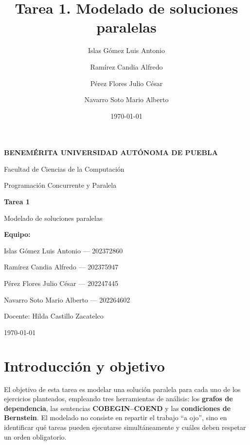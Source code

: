 \documentclass[12pt,letterpaper]{article}
\title{Tarea 1. Modelado de soluciones paralelas}
\author{Islas G\'omez Luis Antonio \and Ram\'irez Candia Alfredo \and P\'erez Flores Julio C\'esar \and Navarro Soto Mario Alberto}
\date{\today}
\begin{document}
\begin{titlepage}
    \centering
    \vspace*{0.5cm}

    {\Large\bfseries BENEM\'ERITA UNIVERSIDAD AUT\'ONOMA DE PUEBLA\par}
    \vspace{0.4cm}
    {\large Facultad de Ciencias de la Computaci\'on\par}
    \vspace{1.2cm}

    {\large Programaci\'on Concurrente y Paralela\par}

    \vfill

    {\Huge\bfseries Tarea 1\par}
    \vspace{0.4cm}
    {\LARGE Modelado de soluciones paralelas\par}
    \vspace{0.3cm}

    \vfill

    {\large\bfseries Equipo:\par}
    \vspace{0.3cm}
    Islas G\'omez Luis Antonio --- 202372860\par
    Ram\'irez Candia Alfredo --- 202375947\par
    P\'erez Flores Julio C\'esar --- 202247445\par
    Navarro Soto Mario Alberto --- 202264602\par

    \vfill

    {\large Docente: Hilda Castillo Zacatelco\par}
    \vspace{0.6cm}
    {\large \today\par}
\end{titlepage}

\tableofcontents
\newpage

\section{Introducci\'on y objetivo}
El objetivo de esta tarea es modelar una soluci\'on paralela para cada uno de
los ejercicios planteados, empleando tres herramientas de an\'alisis:
los \textbf{grafos de dependencia}, las sentencias \textbf{COBEGIN--COEND} y
las \textbf{condiciones de Bernstein}. El modelado no consiste en repartir el
trabajo ``a ojo'', sino en identificar qu\'e tareas pueden ejecutarse
simult\'aneamente y cu\'ales deben respetar un orden obligatorio.
\end{document}
